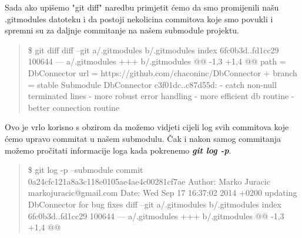 \documentclass {article}
\begin{document}
\begin{enumerate}
\begin{enumerate}
\newpage 
Sada ako upišemo "git diff" naredbu primjetit ćemo da smo promijenili našu .gitmodules datoteku i da postoji nekolicina commitova koje smo povukli i spremni su za daljnje commitanje na našem submodule projektu.
\newline 
    \begin{quote}
        \$ git diff
\newline diff --git a/.gitmodules b/.gitmodules
\newline index 6fc0b3d..fd1cc29 100644
\newline --- a/.gitmodules
\newline +++ b/.gitmodules
\newline @@ -1,3 +1,4 @@
\newline         path = DbConnector
\newline         url = https://github.com/chaconinc/DbConnector
\newline +       branch = stable
\newline  Submodule DbConnector c3f01dc..c87d55d:
\newline   - catch non-null terminated lines
\newline   - more robust error handling
\newline   - more efficient db routine
\newline   - better connection routine
\newline 
    \end{quote}
Ovo je vrlo korisno s obzirom da možemo vidjeti cijeli log svih commitova koje ćemo upravo commitat u našem submodulu. Čak i nakon samog commitanja možemo pročitati informacije loga kada pokrenemo \textbf{\emph{git log -p}}.
\newline 
    \begin{quote}
        \$ git log -p --submodule
\newline commit 0a24cfc121a8a3c118e0105ae4ae4c00281cf7ae
\newline Author: Marko Juracic markojuracic@gmail.com
\newline Date:   Wed Sep 17 16:37:02 2014 +0200
\newline     updating DbConnector for bug fixes
\newline diff --git a/.gitmodules b/.gitmodules
\newline index 6fc0b3d..fd1cc29 100644
\newline --- a/.gitmodules
\newline +++ b/.gitmodules
\newline @@ -1,3 +1,4 @@

\end{quote}
\end{enumerate}
\end{enumerate}
\end{document}
